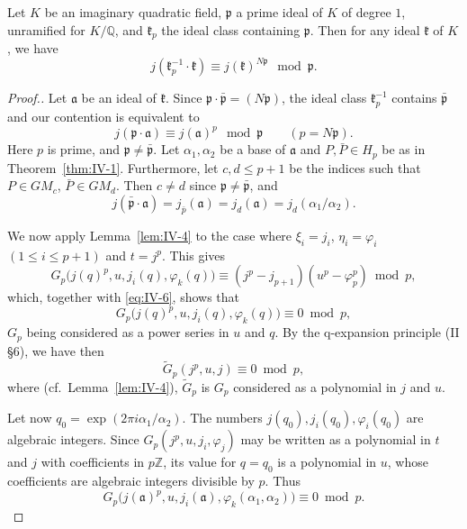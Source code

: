 \begin{theorem}\label{thm:IV-3}
Let $K$ be an imaginary quadratic field, $\mathfrak{p}$ a prime ideal of
$K$ of degree $1$, unramified for $K/\mathbb{Q}$, and $\mathfrak{k}_{p}$
the ideal class containing $\mathfrak{p}$. Then for any ideal
$\mathfrak{k}$ of $K$, we have
\[
j(\mathfrak{k}_{p}^{-1}\cdot\mathfrak{k})
\equiv j(\mathfrak{k})^{N\mathfrak{p}}\mod\mathfrak{p}.
\tag{7}\label{eq:IV-7}
\]
\end{theorem}

\begin{proof}[Proof.]
Let $\mathfrak{a}$ be an ideal of $\mathfrak{k}$. Since
$\mathfrak{p}\cdot\bar{\mathfrak{p}}=(N\mathfrak{p})$, the ideal class
$\mathfrak{k}_{p}^{-1}$ contains $\bar{\mathfrak{p}}$ and our contention
is equivalent to
\[
j(\mathfrak{p}\cdot\mathfrak{a})\equiv j(\mathfrak{a})^{p}
\mod\mathfrak{p}\qquad(p=N\mathfrak{p}).
\tag{8}\label{eq:IV-8}
\]
Here $p$ is prime, and $\mathfrak{p}\neq\bar{\mathfrak{p}}$. Let
$\alpha_{1},\alpha_{2}$ be a base of $\mathfrak{a}$ and
$P,\bar{P}\in H_{p}$ be as in Theorem~\ref{thm:IV-1}. Furthermore, let
$c,d\leq p+1$ be the indices such that $P\in GM_{c}$,
$\bar{P}\in GM_{d}$. Then $c\neq d$ since $\mathfrak{p}\neq\bar{\mathfrak{p}}$,
and
\[
j(\bar{\mathfrak{p}}\cdot\mathfrak{a})=j_{\bar{p}}(\mathfrak{a})
=j_{d}(\mathfrak{a})=j_{d}(\alpha_{1}/\alpha_{2}).
\tag{9}\label{eq:IV-9}
\]

We now apply Lemma~\ref{lem:IV-4} to the case where $\xi_{i}=j_{i}$,
$\eta_{i}=\varphi_{i}$ $(1\leq i\leq p+1)$ and $t=j^{p}$. This gives
\[
G_{p}\bigl(j(q)^{p},u,j_{i}(q),\varphi_{k}(q)\bigr)
\equiv(j^{p}-j_{p+1})(u^{p}-\varphi_{p}^{p})\bmod p,
\]
which, together with \eqref{eq:IV-6}, shows that
\[
G_{p}\bigl(j(q)^{p},u,j_{i}(q),\varphi_{k}(q)\bigr)\equiv 0\bmod p,
\]
$G_{p}$ being considered as a power series in $u$ and $q$. By the
q-expansion principle (II §6), we have then
\[
\widetilde{G}_{p}(j^{p},u,j)\equiv 0\bmod p,
\tag{10}\label{eq:IV-10}
\]
where (cf.\ Lemma~\ref{lem:IV-4}), $\widetilde{G}_{p}$ is $G_{p}$
considered as a polynomial in $j$ and $u$.

Let now $q_{0}=\exp(2\pi i\alpha_{1}/\alpha_{2})$. The numbers
$j(q_{0}),j_{i}(q_{0}),\varphi_{i}(q_{0})$ are algebraic integers. Since
$G_{p}(j^{p},u,j_{i},\varphi_{j})$ may be written as a polynomial in $t$
and $j$ with coefficients in $p\mathbb{Z}$, its value for $q=q_{0}$ is a
polynomial in $u$, whose coefficients are algebraic integers divisible by
$p$. Thus
\[
G_{p}\bigl(j(\mathfrak{a})^{p},u,j_{i}(\mathfrak{a}),
\varphi_{k}(\alpha_{1},\alpha_{2})\bigr)\equiv 0\bmod p.
\tag{11}\label{eq:IV-11}
\]


\end{proof}
